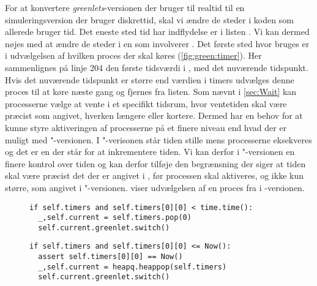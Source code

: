 For at konvertere \emph{greenlets}-versionen der bruger  til realtid til en simuleringsversion der bruger diskrettid, skal vi ændre de steder i koden som allerede bruger tid. 
Det eneste sted tid har indflydelse er i listen . 
Vi kan dermed nøjes med at ændre de steder i \sched en som involverer . 
Det første sted hvor  bruges er i udvælgelsen af hvilken proces der skal køres (\cref{fig:green:timer}). 
Her sammenlignes på linje 204 den første tidsværdi i , med det nuværende tidspunkt.
Hvis det nuværende tidspunkt er større end værdien i timers udvælges denne proces til at køre næste gang og fjernes fra listen.
Som nævnt i \cref{sec:Wait} kan processerne vælge at vente i et specifikt tidsrum, hvor ventetiden skal  være præcist som  angivet, hverken længere eller kortere. Dermed har  \sched en behov for at kunne  styre aktiveringen af processerne på et finere niveau end hvad der er muligt med "-versionen.  
I "-verisonen står tiden stille mens processerne eksekveres og det er \sched en der står for at inkrementere tiden. Vi kan derfor i "-versionen en finere kontrol over tiden og kan derfor tilføje den  begrænsning der siger at tiden skal være præcist det der er angivet i , før processen skal aktiveres, og ikke kun større, som angivet i "-versionen.  viser udvælgelsen af en proces fra  i -versionen.

\begin{figure}[hbtp]
\begin{minipage}[c]{\linewidth}
\begin{lstlisting}[firstnumber=204, label=fig:green:timer, caption=Udvælgelse af proces fra listen timers (fra scheduling.py)]
if self.timers and self.timers[0][0] < time.time():
  _,self.current = self.timers.pop(0)
  self.current.greenlet.switch()
\end{lstlisting}
\end{minipage}
\begin{minipage}[c]{\linewidth}
\begin{lstlisting}[firstnumber=124, label=fig:sim:timer, caption=Udvælgelse af proces fra listen timers (fra simulation.py)]
if self.timers and self.timers[0][0] <= Now():
  assert self.timers[0][0] == Now()
  _,self.current = heapq.heappop(self.timers)
  self.current.greenlet.switch()
\end{lstlisting}
\end{minipage}
\end{figure}

